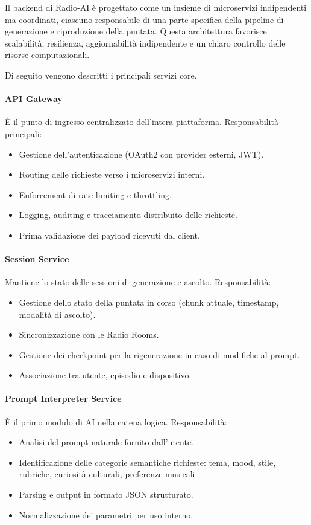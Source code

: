 \documentclass[11pt,a4paper]{article}
\begin{document}
Il backend di Radio-AI è progettato come un insieme di microservizi indipendenti ma coordinati, ciascuno responsabile di una parte specifica della pipeline di generazione e riproduzione della puntata. Questa architettura favorisce scalabilità, resilienza, aggiornabilità indipendente e un chiaro controllo delle risorse computazionali.

Di seguito vengono descritti i principali servizi core.

\paragraph{API Gateway}
È il punto di ingresso centralizzato dell’intera piattaforma.  
Responsabilità principali:
\begin{itemize}
    \item Gestione dell’autenticazione (OAuth2 con provider esterni, JWT).
    \item Routing delle richieste verso i microservizi interni.
    \item Enforcement di rate limiting e throttling.
    \item Logging, auditing e tracciamento distribuito delle richieste.
    \item Prima validazione dei payload ricevuti dal client.
\end{itemize}

\paragraph{Session Service}
Mantiene lo stato delle sessioni di generazione e ascolto.  
Responsabilità:
\begin{itemize}
    \item Gestione dello stato della puntata in corso (chunk attuale, timestamp, modalità di ascolto).
    \item Sincronizzazione con le Radio Rooms.
    \item Gestione dei checkpoint per la rigenerazione in caso di modifiche al prompt.
    \item Associazione tra utente, episodio e dispositivo.
\end{itemize}

\paragraph{Prompt Interpreter Service}
È il primo modulo di AI nella catena logica.  
Responsabilità:
\begin{itemize}
    \item Analisi del prompt naturale fornito dall’utente.
    \item Identificazione delle categorie semantiche richieste: tema, mood, stile, rubriche, curiosità culturali, preferenze musicali.
    \item Parsing e output in formato JSON strutturato.
    \item Normalizzazione dei parametri per uso interno.
\end{itemize}
\end{document}
